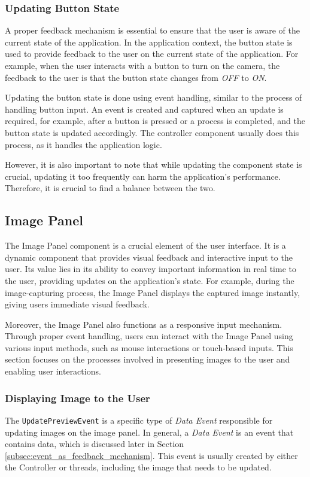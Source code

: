 \subsubsection{Updating Button State}
A proper feedback mechanism is essential to ensure that the user is aware of the current state of the application. In the application context, the button state is used to provide feedback to the user on the current state of the application. For example, when the user interacts with a button to turn on the camera, the feedback to the user is that the button state changes from \textit{OFF} to \textit{ON}.

Updating the button state is done using event handling, similar to the process of handling button input. An event is created and captured when an update is required, for example, after a button is pressed or a process is completed, and the button state is updated accordingly. The controller component usually does this process, as it handles the application logic.

However, it is also important to note that while updating the component state is crucial, updating it too frequently can harm the application's performance. Therefore, it is crucial to find a balance between the two.

\subsection{Image Panel}
\label{subsec:image_panel}
The Image Panel component is a crucial element of the user interface. It is a dynamic component that provides visual feedback and interactive input to the user. Its value lies in its ability to convey important information in real time to the user, providing updates on the application's state. For example, during the image-capturing process, the Image Panel displays the captured image instantly, giving users immediate visual feedback.

Moreover, the Image Panel also functions as a responsive input mechanism. Through proper event handling, users can interact with the Image Panel using various input methods, such as mouse interactions or touch-based inputs. This section focuses on the processes involved in presenting images to the user and enabling user interactions.

\subsubsection{Displaying Image to the User}
The \texttt{UpdatePreviewEvent} is a specific type of \textit{Data Event} responsible for updating images on the image panel. In general, a \textit{Data Event} is an event that contains data, which is discussed later in Section \ref{subsec:event_as_feedback_mechanism}. This event is usually created by either the Controller or threads, including the image that needs to be updated.

